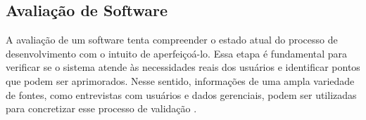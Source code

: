 \subsection{Avaliação de Software}

A avaliação de um software tenta compreender o estado atual do processo de desenvolvimento com o intuito de aperfeiçoá-lo. Essa etapa é fundamental para verificar se o sistema atende às necessidades reais dos usuários e identificar pontos que podem ser aprimorados. Nesse sentido, informações de uma ampla variedade de fontes, como entrevistas com usuários e dados gerenciais, podem ser utilizadas para concretizar esse processo de validação \cite{pressman2016engenharia}.